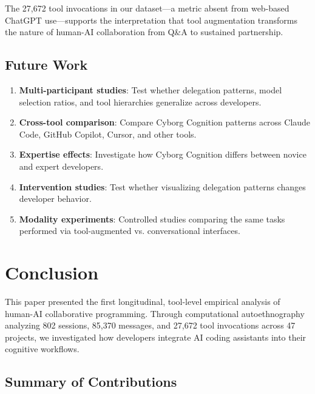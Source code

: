 \documentclass{ntlabs-preprint}
\begin{document}
The 27,672 tool invocations in our dataset---a metric absent from web-based ChatGPT use---supports the interpretation that tool augmentation transforms the nature of human-AI collaboration from Q\&A to sustained partnership.

\subsection{Future Work}

\begin{enumerate}
    \item \textbf{Multi-participant studies}: Test whether delegation patterns, model selection ratios, and tool hierarchies generalize across developers.

    \item \textbf{Cross-tool comparison}: Compare Cyborg Cognition patterns across Claude Code, GitHub Copilot, Cursor, and other tools.

    \item \textbf{Expertise effects}: Investigate how Cyborg Cognition differs between novice and expert developers.

    \item \textbf{Intervention studies}: Test whether visualizing delegation patterns changes developer behavior.

    \item \textbf{Modality experiments}: Controlled studies comparing the same tasks performed via tool-augmented vs. conversational interfaces.
\end{enumerate}

\section{Conclusion}

This paper presented the first longitudinal, tool-level empirical analysis of human-AI collaborative programming. Through computational autoethnography analyzing 802 sessions, 85,370 messages, and 27,672 tool invocations across 47 projects, we investigated how developers integrate AI coding assistants into their cognitive workflows.

\subsection{Summary of Contributions}
\end{document}
